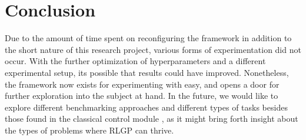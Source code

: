 \documentclass[12pt, final]{dalcsthesis}
\begin{document}




\chapter{Conclusion}

Due to the amount of time spent on reconfiguring the framework in addition to the short nature of this research project,
various forms of experimentation did not occur. With the further optimization of hyperparameters and a different experimental setup, its possible that results could have improved. Nonetheless, the framework now exists for experimenting with easy, and opens a door for further exploration into the subject at hand. In the future, we would like to
explore different benchmarking approaches and different types of tasks besides those found in the classical control module \cite{1606.01540}, as it might bring forth insight about the types of problems where RLGP can thrive.



\end{document}
